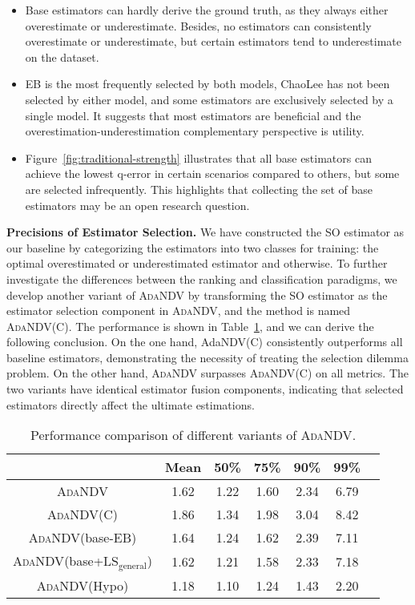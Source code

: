 \begin{itemize}[leftmargin=10pt]
\item {Base estimators can hardly derive the ground truth, as they always either overestimate or underestimate. Besides, no estimators can consistently overestimate or underestimate, but certain estimators tend to underestimate on the dataset.}
\item EB is the most frequently selected by both models, ChaoLee has not been selected by either model, and some estimators are exclusively selected by a single model. It suggests that most estimators are beneficial and the overestimation-underestimation complementary perspective is utility. 
\item Figure~\ref{fig:traditional-strength} illustrates that all base estimators can achieve the lowest q-error in certain scenarios compared to others, but some are selected infrequently. This highlights that collecting the set of base estimators may be an open research question.  
\end{itemize}



\noindent\textbf{{Precisions of} Estimator Selection.}
We have constructed the SO estimator as our baseline {by categorizing} the estimators into two classes {for training}: the optimal overestimated or underestimated estimator and otherwise. To further investigate the differences between the ranking and classification paradigms, we develop another variant of \textsc{AdaNDV} by transforming the SO estimator as the estimator selection component in \textsc{AdaNDV}, and the method is named \textsc{AdaNDV}(C). The performance is shown in Table~\ref{tab:flex}, and we can derive the following conclusion. {On the one hand,} {AdaNDV}(C) consistently outperforms all baseline estimators, demonstrating the necessity of treating the selection dilemma problem. {On the other hand,} \textsc{AdaNDV} surpasses \textsc{AdaNDV}(C) on all metrics. The two variants have identical estimator fusion components, indicating that selected estimators directly affect the ultimate estimations.



\begin{table}[t]
    \centering
    \caption{Performance comparison of different variants of \textsc{AdaNDV}.}
    \begin{tabular}{ccccccc}
\toprule
         & Mean & 50\% & 75\%& 90\% & 99\% \\
\midrule
    \textsc{AdaNDV} & {{1.62}} & {{1.22}}& {{1.60}} & {{2.34}} & {{6.79}} \\
    \textsc{AdaNDV}(C) & {1.86} & {1.34} & {1.98}  & {3.04} & {8.42} \\
    \textsc{AdaNDV}{(base}-EB{)} & {1.64} & 1.24 & 1.62 & {2.39} & {7.11}\\
    \textsc{AdaNDV}{(base}+LS$_\mathrm{general}${)} & 1.62 & 1.21 & 1.58 & 2.33 & {7.18} \\
    \textsc{AdaNDV}(Hypo) & 1.18 & {1.10} & 1.24 & {1.43} & {2.20} \\
\bottomrule
    \end{tabular}
    \label{tab:flex}
\end{table}



